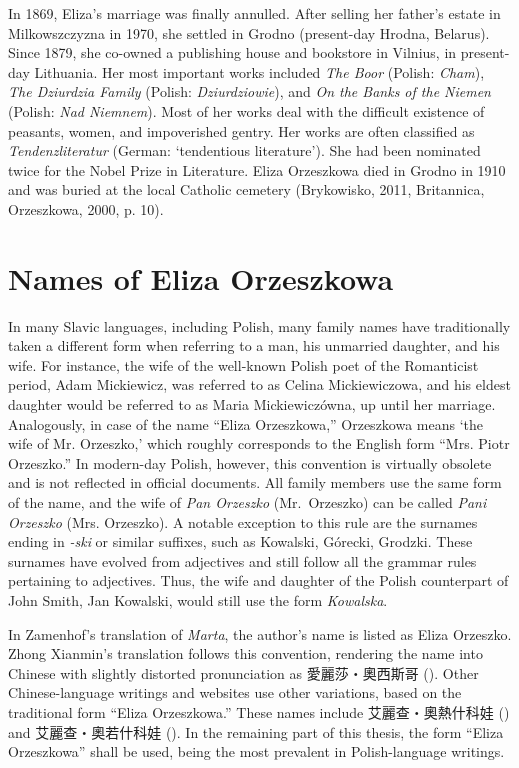 In 1869, Eliza's marriage was finally annulled.
After selling her father's estate in Milkowszczyzna in 1970, she settled in Grodno (present-day Hrodna, Belarus).
Since 1879, she co-owned a publishing house and bookstore in Vilnius, in present-day Lithuania.
Her most important works included \textit{The Boor} (Polish: \textit{Cham}), \textit{The Dziurdzia Family} (Polish: \textit{Dziurdziowie}), and \textit{On the Banks of the Niemen} (Polish: \textit{Nad Niemnem}).
Most of her works deal with the difficult existence of peasants, women, and impoverished gentry.
Her works are often classified as \textit{Tendenzliteratur} (German: `tendentious literature').
She had been nominated twice for the Nobel Prize in Literature.
Eliza Orzeszkowa died in Grodno in 1910 and was buried at the local Catholic cemetery
(Brykowisko, 2011, Britannica, Orzeszkowa, 2000, p. 10).

\section{Names of Eliza Orzeszkowa}
In many Slavic languages, including Polish, many family names have traditionally taken a different form when referring to a man, his unmarried daughter, and his wife.
For instance, the wife of the well-known Polish poet of the Romanticist period, Adam Mickiewicz, was referred to as Celina Mickiewiczowa, and his eldest daughter would be referred to as Maria Mickiewiczówna, up until her marriage.
Analogously, in case of the name ``Eliza Orzeszkowa,'' Orzeszkowa means `the wife of Mr. Orzeszko,' which roughly corresponds to the English form ``Mrs. Piotr Orzeszko.''
In modern-day Polish, however, this convention is virtually obsolete and is not reflected in official documents.
All family members use the same form of the name, and the wife of \textit{Pan Orzeszko} (Mr.\ Orzeszko) can be called \textit{Pani Orzeszko} (Mrs. Orzeszko).
A notable exception to this rule are the surnames ending in \textit{-ski} or similar suffixes, such as Kowalski, Górecki, Grodzki.
These surnames have evolved from adjectives and still follow all the grammar rules pertaining to adjectives.
Thus, the wife and daughter of the Polish counterpart of John Smith, Jan Kowalski, would still use the form \textit{Kowalska}. 

In Zamenhof's translation of \textit{Marta}, the author's name is listed as Eliza Orzeszko.
Zhong Xianmin's translation follows this convention, rendering the name into Chinese with slightly distorted pronunciation as 愛麗莎・奧西斯哥 ().
Other Chinese-language writings and websites use other variations, based on the traditional form ``Eliza Orzeszkowa.''
These names include 艾麗查・奧熱什科娃 () and 艾麗查・奧若什科娃 (). In the remaining part of this thesis, the form ``Eliza Orzeszkowa'' shall be used, being the most prevalent in Polish-language writings.

